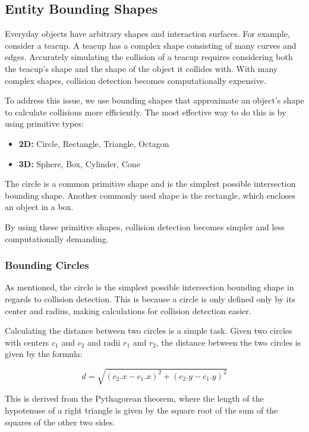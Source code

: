 \documentclass[10pt,a4paper]{article}
\begin{document}
\subsection{Entity Bounding Shapes}
Everyday objects have arbitrary shapes and interaction surfaces. For example,
consider a teacup. A teacup has a complex shape consisting of many curves and
edges. Accurately simulating the collision of a teacup requires considering
both the teacup's shape and the shape of the object it collides with. With many
complex shapes, collision detection becomes computationally expensive.

To address this issue, we use bounding shapes that approximate an object's
shape to calculate collisions more efficiently. The most effective way to do
this is by using primitive types:

\begin{itemize}
    \item \textbf{2D:} Circle, Rectangle, Triangle, Octagon
    \item \textbf{3D:} Sphere, Box, Cylinder, Cone
\end{itemize}

The circle is a common primitive shape and is the simplest possible
intersection bounding shape. Another commonly used shape is the rectangle,
which encloses an object in a box.

By using these primitive shapes, collision detection becomes simpler and less
computationally demanding.

\subsubsection{Bounding Circles}
As mentioned, the circle is the simplest possible intersection bounding shape
in regards to collision detection. This is because a circle is only defined
only by its center and radius, making calculations for collision detection
easier.

Calculating the distance between two circles is a simple task. Given two
circles with centers $c_1$ and $c_2$ and radii $r_1$ and $r_2$, the distance
between the two circles is given by the formula:

\begin{equation}
    d = \sqrt{(c_2.x - c_1.x)^2 + (c_2.y - c_1.y)^2}
\end{equation}

This is derived from the Pythagorean theorem, where the length of the
hypotenuse of a right triangle is given by the square root of the sum of the
squares of the other two sides.
\end{document}
